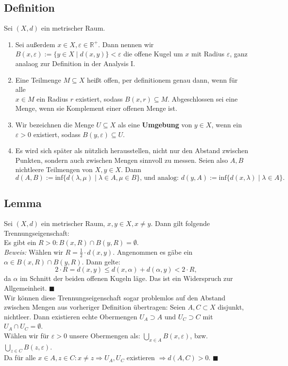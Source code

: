 \documentclass[11pt,leqno]{article}
\begin{document}
\subsection{Definition}
Sei $(X,d)$ ein metrischer Raum.
\begin{enumerate}
    \item Sei außerdem $x \in X, \varepsilon \in \mathbb{R}^+$. Dann nennen wir $B(x,\varepsilon):=\{y \in X \mid d(x,y) \} < \varepsilon$ die offene 
    Kugel um $x$ mit Radius $\varepsilon$, ganz analaog zur Definition in der Analysis I. 
    \item Eine Teilmenge $M \subseteq X$ heißt offen, per definitionem genau dann, wenn für alle \\ $x \in M$ ein Radius $r$ existiert, 
    sodass $B(x,r) \subseteq M$. Abgeschlossen sei eine Menge, wenn sie Komplement einer offenen Menge ist.
    \item Wir bezeichnen die Menge $U \subseteq X$ als eine \textbf{Umgebung} von $y \in X$, wenn ein $\varepsilon > 0$ existiert, 
    sodass $B(y,\varepsilon) \subseteq U$.
    \item Es wird sich später als nützlich herausstellen, nicht nur den Abstand zwischen Punkten, sondern auch zwischen Mengen sinnvoll zu messen. 
    Seien also $A,B$ nichtleere Teilmengen von $X, y \in X$. 
    Dann \[d(A,B):= \text{inf}\{d(\lambda, \mu) \mid \lambda \in A, \mu \in B \}\text{, und analog: }d(y,A):= 
    \text{inf}\{d(x, \lambda) \mid \lambda \in A \}.\]
\end{enumerate}

\subsection{Lemma}
Sei $(X,d)$ ein metrischer Raum, $x,y \in X, x \neq y$. Dann gilt folgende Trennungseigenschaft: \\
Es gibt ein $R > 0: B(x,R) \cap B(y,R) = \emptyset$. \\
\textit{Beweis:} Wählen wir $R= \frac{1}{2} \cdot d(x,y)$. Angenommen es gäbe ein $\alpha \in B(x,R) \cap B(y,R)$. Dann gelte: 
\[2 \cdot R = d(x,y) \leq d(x,\alpha) + d(\alpha,y) < 2 \cdot R, \]
da $\alpha$ im Schnitt der beiden offenen Kugeln läge. Das ist ein Widerspruch zur Allgemeinheit. $\blacksquare$\\
Wir können diese Trennungseigenschaft sogar problemlos auf den Abstand zwischen Mengen aus vorheriger Definition übertragen: 
Seien $A,C \subset X$ disjunkt, nichtleer. Dann existieren echte Obermengen $U_A \supset A$ und $U_C \supset C$ mit $U_A \cap U_C = \emptyset$. \\
Wählen wir für $\varepsilon > 0$ unsere Obermengen als: $\bigcup_{x \in A}B(x,\varepsilon) $, bzw. $\bigcup_{z \in C}B(z,\varepsilon) $.\\ 
Da für alle $x\in A, z \in C: x \neq z \Rightarrow U_A, U_C$ existieren $\Rightarrow d(A,C) > 0$. $\blacksquare$
\end{document}
